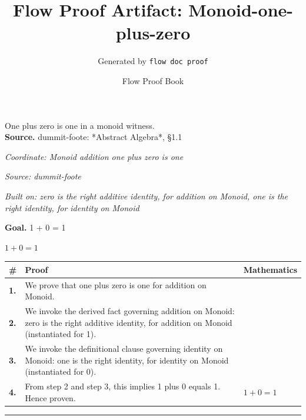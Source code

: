 \documentclass[11pt]{article}
\title{Flow Proof Artifact: Monoid-one-plus-zero}
\author{Generated by \texttt{flow doc proof}}
\date{Flow Proof Book}
\theoremstyle{definition}
\begin{document}
\maketitle
One plus zero is one in a monoid witness.\\[0.5em]
\textbf{Source.} dummit-foote: *Abstract Algebra*, §1.1\\[0.5em]
\bigskip
{}\par
\smallskip\noindent\textit{Coordinate: Monoid \cdot addition \cdot one plus zero is one}\par
\smallskip\noindent\textit{Source: dummit-foote}\par
\smallskip\noindent\textit{Built on: zero is the right additive identity, for addition on Monoid, one is the right identity, for identity on Monoid}\par
\medskip
\noindent\textbf{Goal.} 1 + 0 = 1\par
\noindent$\displaystyle 1 + 0 = 1$\par
\medskip
\noindent
\begin{tabular}{@{} >{\raggedright\arraybackslash}p{} >{\raggedright\arraybackslash}p{} >{\raggedleft\arraybackslash}p{} @{}}
\textbf{\#} & \textbf{Proof} & \textbf{Mathematics} \\
\midrule
\textbf{1.} & We prove that one plus zero is one for addition on Monoid. & \\[0.45em]
\textbf{2.} & We invoke the derived fact governing addition on Monoid: zero is the right additive identity, for addition on Monoid (instantiated for 1). & \\[0.45em]
\textbf{3.} & We invoke the definitional clause governing identity on Monoid: one is the right identity, for identity on Monoid (instantiated for 0). & \\[0.45em]
\textbf{4.} & From step 2 and step 3, this implies 1 plus 0 equals 1. Hence proven. & $\displaystyle 1 + 0 = 1$ \\[0.45em]
\bottomrule
\end{tabular}
\label{thm:Monoid-addition-one_plus_zero_is_one}
\par\medskip\hrule
\end{document}
